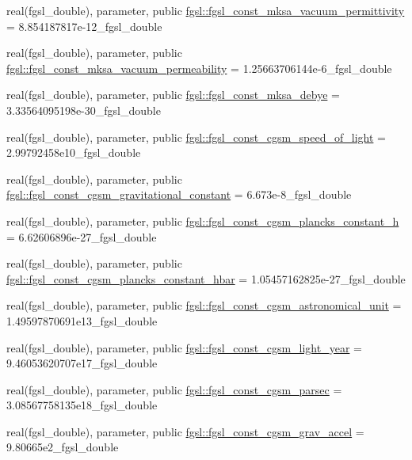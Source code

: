 \begin{DoxyCompactItemize}
\item 
real(fgsl\+\_\+double), parameter, public \hyperlink{namespacefgsl_a74a2728881184d5037b397e55d24411d}{fgsl\+::fgsl\+\_\+const\+\_\+mksa\+\_\+vacuum\+\_\+permittivity} = 8.\+854187817e-\/12\+\_\+fgsl\+\_\+double
\item 
real(fgsl\+\_\+double), parameter, public \hyperlink{namespacefgsl_a16aee30f6ddf44068a051e80be1f1e0e}{fgsl\+::fgsl\+\_\+const\+\_\+mksa\+\_\+vacuum\+\_\+permeability} = 1.\+25663706144e-\/6\+\_\+fgsl\+\_\+double
\item 
real(fgsl\+\_\+double), parameter, public \hyperlink{namespacefgsl_ad4022c36598c9b49cb3bc9497fcdc06c}{fgsl\+::fgsl\+\_\+const\+\_\+mksa\+\_\+debye} = 3.\+33564095198e-\/30\+\_\+fgsl\+\_\+double
\item 
real(fgsl\+\_\+double), parameter, public \hyperlink{namespacefgsl_a5b4812e235747b48af51d2e576dfa469}{fgsl\+::fgsl\+\_\+const\+\_\+cgsm\+\_\+speed\+\_\+of\+\_\+light} = 2.\+99792458e10\+\_\+fgsl\+\_\+double
\item 
real(fgsl\+\_\+double), parameter, public \hyperlink{namespacefgsl_a9f255e9dfccd5852a1229344cadc48ba}{fgsl\+::fgsl\+\_\+const\+\_\+cgsm\+\_\+gravitational\+\_\+constant} = 6.\+673e-\/8\+\_\+fgsl\+\_\+double
\item 
real(fgsl\+\_\+double), parameter, public \hyperlink{namespacefgsl_ace25c1aaa228a6b88d1f8e8ad1811cc5}{fgsl\+::fgsl\+\_\+const\+\_\+cgsm\+\_\+plancks\+\_\+constant\+\_\+h} = 6.\+62606896e-\/27\+\_\+fgsl\+\_\+double
\item 
real(fgsl\+\_\+double), parameter, public \hyperlink{namespacefgsl_a59a3499a4c13d0d58c0aa1470c6c589a}{fgsl\+::fgsl\+\_\+const\+\_\+cgsm\+\_\+plancks\+\_\+constant\+\_\+hbar} = 1.\+05457162825e-\/27\+\_\+fgsl\+\_\+double
\item 
real(fgsl\+\_\+double), parameter, public \hyperlink{namespacefgsl_af1dd23df42a3363f75423e5d3ff79cde}{fgsl\+::fgsl\+\_\+const\+\_\+cgsm\+\_\+astronomical\+\_\+unit} = 1.\+49597870691e13\+\_\+fgsl\+\_\+double
\item 
real(fgsl\+\_\+double), parameter, public \hyperlink{namespacefgsl_a7a0fc1754861e860249707775c149bd8}{fgsl\+::fgsl\+\_\+const\+\_\+cgsm\+\_\+light\+\_\+year} = 9.\+46053620707e17\+\_\+fgsl\+\_\+double
\item 
real(fgsl\+\_\+double), parameter, public \hyperlink{namespacefgsl_a3eb251959ceffa5d3604d70bd5279f02}{fgsl\+::fgsl\+\_\+const\+\_\+cgsm\+\_\+parsec} = 3.\+08567758135e18\+\_\+fgsl\+\_\+double
\item 
real(fgsl\+\_\+double), parameter, public \hyperlink{namespacefgsl_abcdb6fe4c8e314d2d05ee14a854357fd}{fgsl\+::fgsl\+\_\+const\+\_\+cgsm\+\_\+grav\+\_\+accel} = 9.\+80665e2\+\_\+fgsl\+\_\+double

\end{DoxyCompactItemize}
